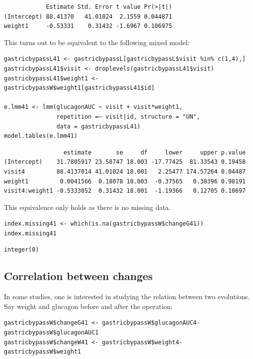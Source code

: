 \documentclass[12pt]{article}
\begin{document}
\begin{verbatim}
            Estimate Std. Error t value Pr(>|t|)
(Intercept) 88.41370   41.01024  2.1559 0.044871
weight1     -0.53331    0.31432 -1.6967 0.106975
\end{verbatim}


This turns out to be equivalent to the following mixed model:
\lstset{language=r,label= ,caption= ,captionpos=b,numbers=none}
\begin{lstlisting}
gastricbypassL41 <- gastricbypassL[gastricbypassL$visit %in% c(1,4),]
gastricbypassL41$visit <- droplevels(gastricbypassL41$visit)
gastricbypassL41$weight1 <- gastricbypassW$weight1[gastricbypassL41$id]

e.lmm41 <- lmm(glucagonAUC ~ visit + visit*weight1,
               repetition =~ visit|id, structure = "UN",
               data = gastricbypassL41)
model.tables(e.lmm41)
\end{lstlisting}

\begin{verbatim}
                 estimate       se     df     lower     upper p.value
(Intercept)    31.7805917 23.58747 18.003 -17.77425  81.33543 0.19458
visit4         88.4137014 41.01024 18.001   2.25477 174.57264 0.04487
weight1         0.0041566  0.18078 18.003  -0.37565   0.38396 0.98191
visit4:weight1 -0.5333052  0.31432 18.001  -1.19366   0.12705 0.10697
\end{verbatim}


This equivalence only holds as there is no missing data.
\lstset{language=r,label= ,caption= ,captionpos=b,numbers=none}
\begin{lstlisting}
index.missing41 <- which(is.na(gastricbypassW$changeG41))
index.missing41
\end{lstlisting}

\begin{verbatim}
integer(0)
\end{verbatim}


\clearpage

\subsection{Correlation between changes}
\label{sec:org718cb66}

In some studies, one is interested in studying the relation between
two evolutions. Say weight and glucagon before and after the
operation:
\lstset{language=r,label= ,caption= ,captionpos=b,numbers=none}
\begin{lstlisting}
gastricbypassW$changeG41 <- gastricbypassW$glucagonAUC4-gastricbypassW$glucagonAUC1
gastricbypassW$changeW41 <- gastricbypassW$weight4-gastricbypassW$weight1
\end{lstlisting}
\end{document}
